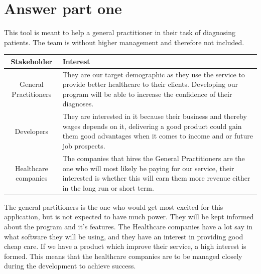 \section{Answer part one}
This tool is meant to help a general practitioner in their task of diagnosing patients. The team is without higher management and therefore not included.
\begin{center}
	\begin{tabular}[h]{|c|p{25em}|}
		\hline
		Stakeholder & Interest \\ \hline
		General Practitioners & They are our target demographic as they use the service to provide better healthcare to their clients. Developing our program will be able to increase the confidence of their diagnoses. \\ \hline
		Developers & They are interested in it because their business and thereby wages depends on it, delivering a good product could gain them good advantages when it comes to income and or future job prospects. \\ \hline
		Healthcare companies & The companies that hires the General Practitioners are the one who will most likely be paying for our service, their interested is whether this will earn them more revenue either in the long run or short term.\\ \hline
	\end{tabular}
\end{center}
The general partitioners is the one who would get most excited for this application, but is not expected to have much power. They will be kept informed about the program and it's features.
\newline
The Healthcare companies have a lot say in what software they will be using, and they have an interest in providing good cheap care. If we have a product which improve their service, a high interest is formed. This means that the healthcare companies are to be managed closely during the development to achieve success.


